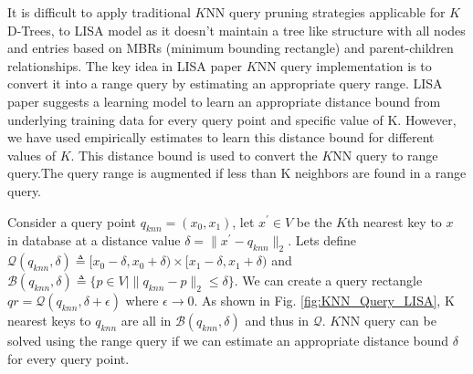 It is difficult to apply traditional $K$NN query pruning strategies applicable for $K$D-Trees, to LISA model as it doesn't maintain a tree like structure with all nodes and
entries based on MBRs (minimum bounding rectangle) and parent-children relationships. %
The key idea in LISA paper $K$NN query implementation is to convert it into a range query by estimating an appropriate query range. LISA paper suggests a learning model to learn an appropriate distance bound from underlying training data for every query point and specific value of K. However, we have used empirically estimates to learn this distance bound for different values of $K$. This distance bound is used to convert the $K$NN query to range query.The query range is augmented if less than K neighbors are found in a range query. 

Consider a query point $q_{knn}=(x_{0},x_{1})$, let $x^{'} \in V$ be the $K$th nearest key to $x$ in database at a distance value $\delta = \| x^{'}-q_{knn}\|_{2} $. Lets define $ \mathcal{Q}(q_{knn},\delta) \triangleq [x_{0}-\delta, x_{0}+\delta) \times[x_{1}-\delta, x_{1}+\delta)$ and $\mathcal{B}(q_{knn}, \delta)  \triangleq \{p \in V \mid \| q_{knn}-p\|_{2} \leq \delta \} $. We can create a query rectangle $qr =  \mathcal{Q}(q_{knn}, \delta + \epsilon)$ where $\epsilon \rightarrow 0$. As shown in Fig. \ref{fig:KNN_Query_LISA}, K nearest keys to $q_{knn}$ are all in $\mathcal{B}(q_{knn}, \delta)$ and thus in $\mathcal{Q}$. $K$NN query can be solved using the range query if we can estimate an appropriate distance bound $\delta$ for every query point.

